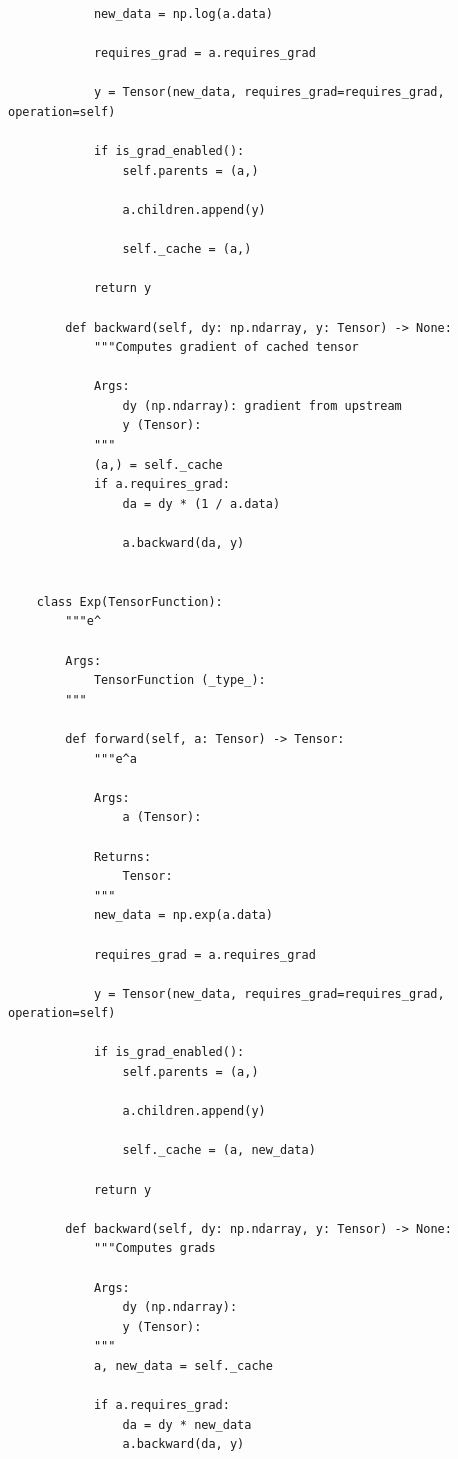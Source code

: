 \documentclass{article}
\begin{document}
\begin{verbatim}
            new_data = np.log(a.data)

            requires_grad = a.requires_grad

            y = Tensor(new_data, requires_grad=requires_grad, operation=self)

            if is_grad_enabled():
                self.parents = (a,)

                a.children.append(y)

                self._cache = (a,)

            return y

        def backward(self, dy: np.ndarray, y: Tensor) -> None:
            """Computes gradient of cached tensor

            Args:
                dy (np.ndarray): gradient from upstream
                y (Tensor):
            """
            (a,) = self._cache
            if a.requires_grad:
                da = dy * (1 / a.data)

                a.backward(da, y)


    class Exp(TensorFunction):
        """e^

        Args:
            TensorFunction (_type_):
        """

        def forward(self, a: Tensor) -> Tensor:
            """e^a

            Args:
                a (Tensor):

            Returns:
                Tensor:
            """
            new_data = np.exp(a.data)

            requires_grad = a.requires_grad

            y = Tensor(new_data, requires_grad=requires_grad, operation=self)

            if is_grad_enabled():
                self.parents = (a,)

                a.children.append(y)

                self._cache = (a, new_data)

            return y

        def backward(self, dy: np.ndarray, y: Tensor) -> None:
            """Computes grads

            Args:
                dy (np.ndarray):
                y (Tensor):
            """
            a, new_data = self._cache

            if a.requires_grad:
                da = dy * new_data
                a.backward(da, y)



\end{verbatim}
\end{document}
